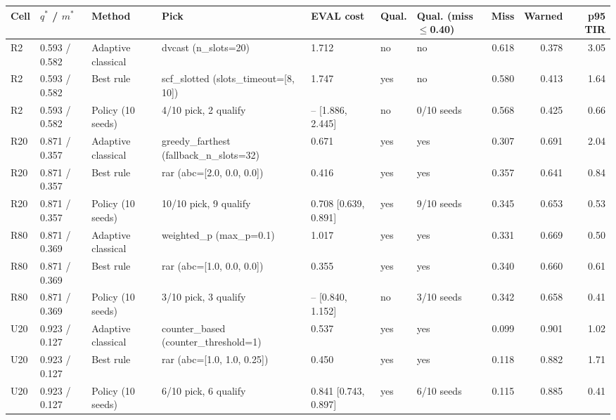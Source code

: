 \begin{tabular}{lllllllrrr}
\hline
Cell & $q^*$ / $m^*$ & Method & Pick & EVAL cost & Qual. & Qual. (miss$\le$0.40) & Miss & Warned & p95 TIR \\
\hline
R2 & 0.593 / 0.582 & Adaptive classical & dvcast (n\_slots=20) & 1.712 & no & no & 0.618 & 0.378 & 3.05 \\
R2 & 0.593 / 0.582 & Best rule & scf\_slotted (slots\_timeout=[8, 10]) & 1.747 & yes & no & 0.580 & 0.413 & 1.64 \\
R2 & 0.593 / 0.582 & Policy (10 seeds) & 4/10 pick, 2 qualify & -- [1.886, 2.445] & no & 0/10 seeds & 0.568 & 0.425 & 0.66 \\
R20 & 0.871 / 0.357 & Adaptive classical & greedy\_farthest (fallback\_n\_slots=32) & 0.671 & yes & yes & 0.307 & 0.691 & 2.04 \\
R20 & 0.871 / 0.357 & Best rule & rar (abc=[2.0, 0.0, 0.0]) & 0.416 & yes & yes & 0.357 & 0.641 & 0.84 \\
R20 & 0.871 / 0.357 & Policy (10 seeds) & 10/10 pick, 9 qualify & 0.708 [0.639, 0.891] & yes & 9/10 seeds & 0.345 & 0.653 & 0.53 \\
R80 & 0.871 / 0.369 & Adaptive classical & weighted\_p (max\_p=0.1) & 1.017 & yes & yes & 0.331 & 0.669 & 0.50 \\
R80 & 0.871 / 0.369 & Best rule & rar (abc=[1.0, 0.0, 0.0]) & 0.355 & yes & yes & 0.340 & 0.660 & 0.61 \\
R80 & 0.871 / 0.369 & Policy (10 seeds) & 3/10 pick, 3 qualify & -- [0.840, 1.152] & no & 3/10 seeds & 0.342 & 0.658 & 0.41 \\
U20 & 0.923 / 0.127 & Adaptive classical & counter\_based (counter\_threshold=1) & 0.537 & yes & yes & 0.099 & 0.901 & 1.02 \\
U20 & 0.923 / 0.127 & Best rule & rar (abc=[1.0, 1.0, 0.25]) & 0.450 & yes & yes & 0.118 & 0.882 & 1.71 \\
U20 & 0.923 / 0.127 & Policy (10 seeds) & 6/10 pick, 6 qualify & 0.841 [0.743, 0.897] & yes & 6/10 seeds & 0.115 & 0.885 & 0.41 \\
\hline
\end{tabular}
